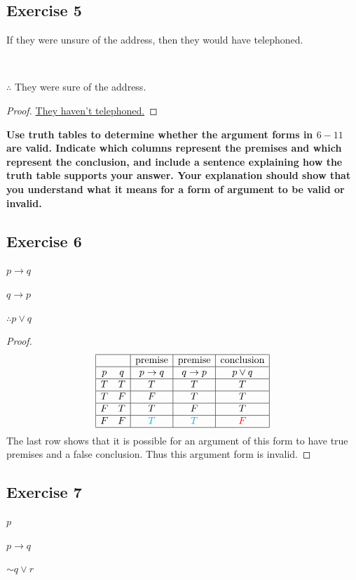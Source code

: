 \documentclass[14pt]{extarticle}
\newcommand{\fbl}{\underline{\hspace{1cm}}\,\,}
\begin{document}
\subsection{Exercise 5}
If they were unsure of the address, then they would have telephoned.

\fbl

$\therefore$ They were sure of the address.

\begin{proof}
\underline{They haven't telephoned.}
\end{proof}

{\bf \color{cyan} Use truth tables to determine whether the argument forms in
$6-11$ are valid. Indicate which columns represent the premises and which
represent the conclusion, and include a sentence explaining how the truth table
supports your
answer. Your explanation should show that you understand what it means for a
form of argument to be valid or invalid.}

\subsection{Exercise 6}
$p \to q$

$q \to p$

$\therefore p \vee q$

\begin{proof}
$$
\begin{array}{|cc|c|c|c|}
\hline
& & \text{premise} & \text{premise} & \text{conclusion} \\
\hline
p & q & p \to q & q \to p & p \vee q \\
\hline
T & T & T & T & T \\
\hline
T & F & F & T & T \\
\hline
F & T & T & F & T \\
\hline
F & F & \color{cyan} T & \color{cyan} T & \color{red} F \\
\hline
\end{array}
$$
The last row shows that it is possible for an argument of this form to have true
premises and a false conclusion. Thus this argument form is invalid.
\end{proof}

\subsection{Exercise 7}
$p$

$p \to q$

${\sim q} \vee r$
\end{document}
